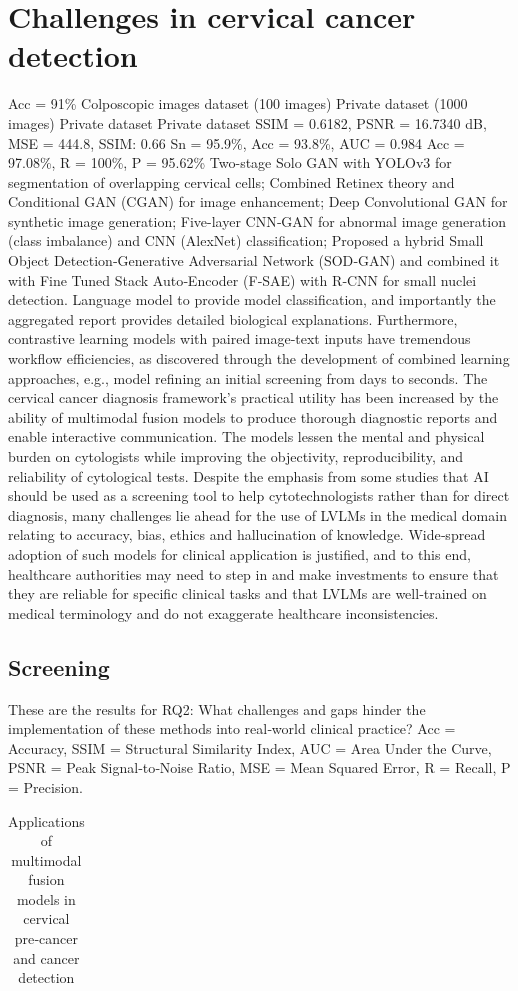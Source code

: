 \documentclass[final,5p,times,twocolumn,authoryear]{elsarticle}
\begin{document}
\section{Challenges in cervical cancer detection}
Acc = 91\% 
Colposcopic images dataset (100 images) 
Private dataset (1000 images) 
Private dataset 
Private dataset 
SSIM = 0.6182, PSNR = 16.7340 dB, MSE = 444.8, SSIM: 0.66 
Sn = 95.9\%, Acc = 93.8\%, AUC = 0.984 
Acc = 97.08\%, R = 100\%, P = 95.62\% 
Two-stage Solo GAN with YOLOv3 for segmentation of overlapping cervical cells; Combined Retinex theory and Conditional GAN (CGAN) for image enhancement; Deep Convolutional GAN for synthetic image generation; Five-layer CNN‑GAN for abnormal image generation (class imbalance) and CNN (AlexNet) classification; Proposed a hybrid Small Object Detection‑Generative Adversarial Network (SOD‑GAN) and combined it with Fine Tuned Stack Auto‑Encoder (F‑SAE) with R‑CNN for small nuclei detection. 
Language model to provide model classification, and importantly the aggregated report provides detailed biological explanations. Furthermore, contrastive learning models with paired image‑text inputs have tremendous workflow efficiencies, as discovered through the development of combined learning approaches, e.g., model refining an initial screening from days to seconds. 
The cervical cancer diagnosis framework’s practical utility has been increased by the ability of multimodal fusion models to produce thorough diagnostic reports and enable interactive communication. The models lessen the mental and physical burden on cytologists while improving the objectivity, reproducibility, and reliability of cytological tests. Despite the emphasis from some studies that AI should be used as a screening tool to help cytotechnologists rather than for direct diagnosis, many challenges lie ahead for the use of LVLMs in the medical domain relating to accuracy, bias, ethics and hallucination of knowledge. Wide‑spread adoption of such models for clinical application is justified, and to this end, healthcare authorities may need to step in and make investments to ensure that they are reliable for specific clinical tasks and that LVLMs are well‑trained on medical terminology and do not exaggerate healthcare inconsistencies. 
\subsection{Screening}
These are the results for RQ2: What challenges and gaps hinder the implementation of these methods into real‑world clinical practice? 
Acc = Accuracy, SSIM = Structural Similarity Index, AUC = Area Under the Curve, PSNR = Peak Signal‑to‑Noise Ratio, MSE = Mean Squared Error, R = Recall, P = Precision. 
\begin{table}
\centering
\caption{Applications of multimodal fusion models in cervical pre‑cancer and cancer detection}
\label{tab:applications}
\begin{tabular}{lll}
\hline
\hline
\end{tabular}
\end{table}
\end{document}
